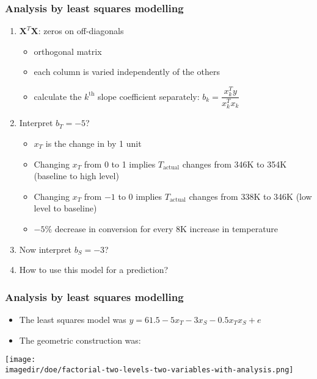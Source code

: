 \begin{frame}\frametitle{Analysis by least squares modelling}
	\vspace{6pt}
	\begin{enumerate}
		\item	$\mathbf{X}^T\mathbf{X}$: zeros on off-diagonals
		\begin{itemize}
			\item	orthogonal matrix
			\item	each column is varied independently of the others
			\item	calculate the $k^\text{th}$ slope coefficient separately: $b_k = \dfrac{x_k^Ty}{x_k^Tx_k}$
		\end{itemize}
		\item	Interpret $b_T = -5$?
		\begin{itemize}
			\item	$x_T$ is the change in {} by 1 unit
			\item	Changing $x_T$ from 0 to 1 implies $T_\text{actual}$ changes from 346K to 354K (baseline to high level)
			\item	Changing $x_T$ from $-1$ to 0 implies $T_\text{actual}$ changes from 338K to 346K (low level to baseline)
			\item	$-5$\% decrease in conversion for every 8K increase in temperature
		\end{itemize}
		\item	Now interpret $b_S = -3$?
		\item	How to use this model for a prediction?
	\end{enumerate}
\end{frame}

\begin{frame}\frametitle{Analysis by least squares modelling}
	\begin{itemize}
		\item	{\footnotesize The least squares model was} $y = 61.5 - 5 x_T - 3 x_S - 0.5 x_Tx_S + e$
		\item	The geometric construction was:
	\end{itemize}
	\begin{center}
		\texttt{[image: \\imagedir/doe/factorial-two-levels-two-variables-with-analysis.png]}
	\end{center}
	{}
\end{frame}

